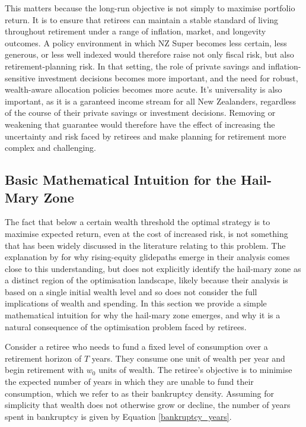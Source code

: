 \documentclass[11pt]{article}
\begin{document}
This matters because the long-run objective is not simply to maximise portfolio return. It is to ensure that retirees can maintain a stable standard of living throughout retirement under a range of inflation, market, and longevity outcomes. A policy environment in which NZ Super becomes less certain, less generous, or less well indexed would therefore raise not only fiscal risk, but also retirement-planning risk. In that setting, the role of private savings and inflation-sensitive investment decisions becomes more important, and the need for robust, wealth-aware allocation policies becomes more acute. It's universality is also important, as it is a garanteed income stream for all New Zealanders, regardless of the course of their private savings or investment decisions. Removing or weakening that guarantee would therefore have the effect of increasing the uncertainty and risk faced by retirees and make planning for retirement more complex and challenging.


\subsection{Basic Mathematical Intuition for the Hail-Mary Zone} 

The fact that below a certain wealth threshold the optimal strategy is to maximise expected return, even at the cost of increased risk, is not something that has been widely discussed in the literature relating to this problem. The explanation by \textcite{pfau2014rising} for why rising-equity glidepaths emerge in their analysis comes close to this understanding, but does not explicitly identify the hail-mary zone as a distinct region of the optimisation landscape, likely because their analysis is based on a single initial wealth level and so does not consider the full implications of wealth and spending. In this section we provide a simple mathematical intuition for why the hail-mary zone emerges, and why it is a natural consequence of the optimisation problem faced by retirees. 

Consider a retiree who needs to fund a fixed level of consumption over a retirement horizon of \(T\) years. They consume one unit of wealth per year and begin retirement with \(w_0\) units of wealth. The retiree's objective is to minimise the expected number of years in which they are unable to fund their consumption, which we refer to as their bankruptcy density. Assuming for simplicity that wealth does not otherwise grow or decline, the number of years spent in bankruptcy is given by Equation \ref{bankruptcy_years}. 
\end{document}
